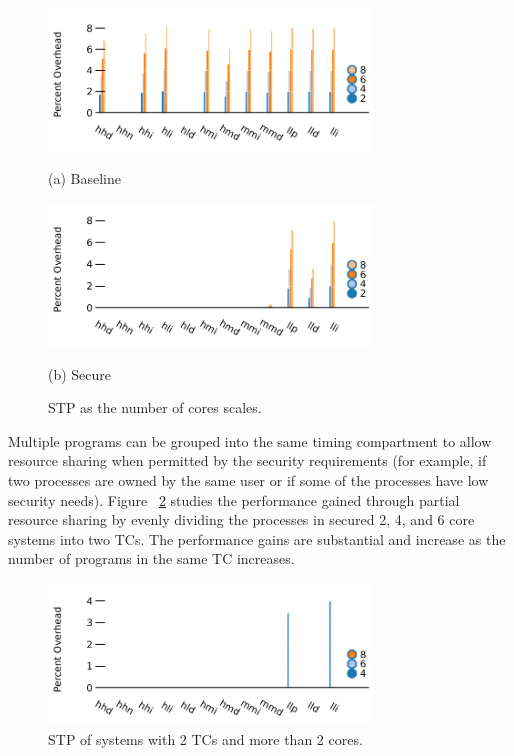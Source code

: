 \begin{figure}%
  \begin{minipage}{1.2in}
    \includegraphics[width=3.4in]{figs/baseline_stp.pdf}
    \caption*{(a) Baseline}
  \end{minipage}
  \qquad\qquad\qquad\qquad\qquad\qquad\qquad\qquad\qquad
  \begin{minipage}{1.2in}%
        \includegraphics[width=3.4in]{figs/n_core_n_tc_stp.pdf}
        \caption*{(b) Secure}
  \end{minipage}%
  \caption{STP as the number of cores scales.} 
  \label{fig:ntcstp}%
\end{figure}

Multiple programs can be grouped into the same timing compartment to allow 
resource sharing when permitted by the security requirements (for example, if 
two processes are owned by the same user or if some of the processes have low 
security needs). Figure ~\ref{fig:2tcstp} studies the performance gained 
through partial resource sharing by evenly dividing the processes in secured 2, 
4, and 6 core systems into two TCs. The performance gains are substantial and 
increase as the number of programs in the same TC increases.

\begin{figure}
    \begin{center}
        \includegraphics[width=3.4in]{figs/n_core_2_tc_stp.pdf}
        \caption{STP of systems with 2 TCs and more than 2 cores.}
        \label{fig:2tcstp}
    \end{center}
\end{figure}

